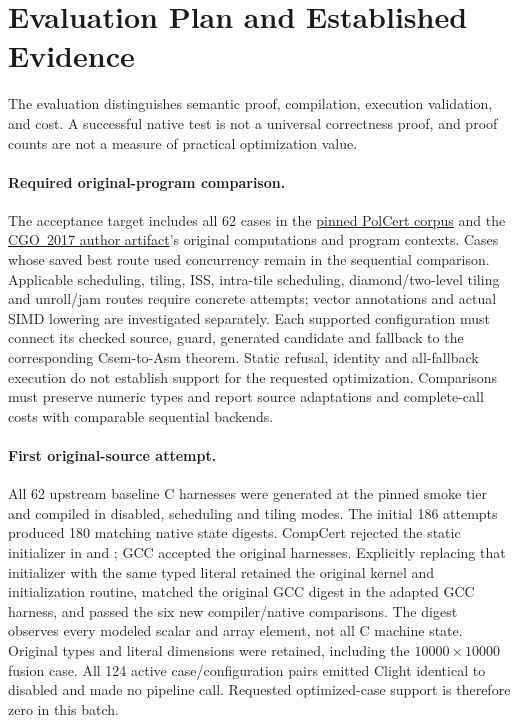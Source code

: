 \section{Evaluation Plan and Established Evidence}
\label{sec:evaluation}

The evaluation distinguishes semantic proof, compilation, execution validation,
and cost. A successful native test is not a universal correctness proof, and
proof counts are not a measure of practical optimization value.

\paragraph{Required original-program comparison.}
The acceptance target includes all 62 cases in the
\href{https://github.com/Hughshine/PolCert/tree/ca1ae3199c816594bab9d51eb77309a0d17527aa/tests/polopt-generated}{pinned PolCert corpus}
and the \href{https://github.com/jdoerfert/CGO17_ArtifactEvaluation/tree/1b23e28261eb1c161192afa86ab996eb67d65f0c}{CGO~2017 author artifact}'s
original computations and program contexts.
Cases whose saved best route used concurrency remain in the sequential
comparison. Applicable scheduling, tiling, ISS, intra-tile scheduling,
diamond/two-level tiling and unroll/jam routes require concrete attempts;
vector annotations and actual SIMD lowering are investigated separately.
Each supported configuration must connect its checked source, guard, generated
candidate and fallback to the corresponding Csem-to-Asm theorem. Static
refusal, identity and all-fallback execution do not establish support for the
requested optimization. Comparisons must preserve numeric types and report
source adaptations and complete-call costs with comparable sequential backends.

\paragraph{First original-source attempt.}
All 62 upstream baseline C harnesses were generated at the pinned smoke tier
and compiled in disabled, scheduling and tiling modes. The initial 186 attempts
produced 180 matching native state digests. CompCert rejected the static
 initializer in  and ; GCC
accepted the original harnesses. Explicitly replacing that initializer with
the same typed literal retained the original kernel and initialization routine,
matched the original GCC digest in the adapted GCC harness, and passed the six
new compiler/native comparisons. The digest observes every modeled scalar and
array element, not all C machine state. Original types and literal dimensions
were retained, including the $10000\times10000$ fusion case.
All 124 active case/configuration pairs emitted Clight identical to disabled
and made no pipeline call. Requested optimized-case support is therefore zero
in this batch.

